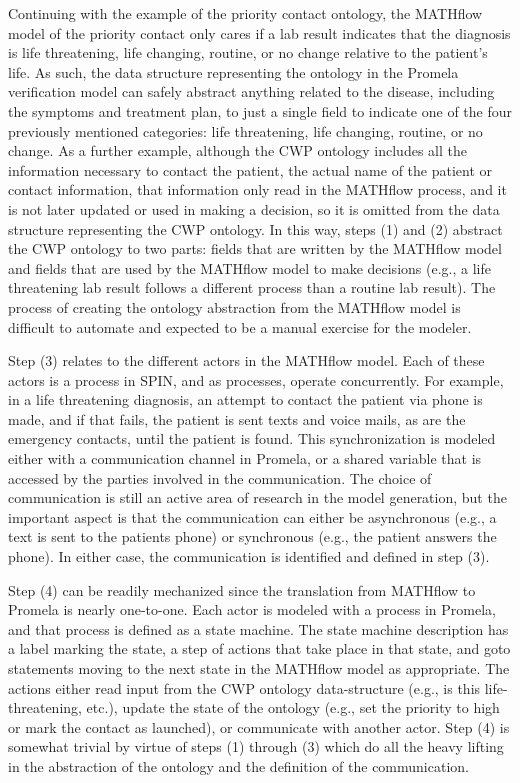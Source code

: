 \begin{itemize}
Continuing with the example of the priority contact ontology, the MATHflow model of the priority contact only cares if a lab result indicates that the diagnosis is life threatening, life changing, routine, or no change relative to the patient's life. As such, the data structure representing the ontology in the Promela verification model can safely abstract anything related to the disease, including the symptoms and treatment plan, to just a single field to indicate one of the four previously mentioned categories: life threatening, life changing, routine, or no change.  As a further example, although the CWP ontology includes all the information necessary to contact the patient, the actual name of the patient or contact information, that information only read in the MATHflow process, and it is not later updated or used in making a decision, so it is omitted from the data structure representing the CWP ontology. In this way, steps (1) and (2) abstract the CWP ontology to two parts: fields that are written by the MATHflow model and fields that are used by the MATHflow model to make decisions (e.g., a life threatening lab result follows a different process than a routine lab result). The process of creating the ontology abstraction from the MATHflow model is difficult to automate and expected to be a manual exercise for the modeler.

Step (3) relates to the different actors in the MATHflow model. Each of these actors is a process in SPIN, and as processes, operate concurrently. For example, in a life threatening diagnosis, an attempt to contact the patient via phone is made, and if that fails, the patient is sent texts and voice mails, as are the emergency contacts, until the patient is found. This synchronization is modeled either with a communication channel in Promela, or a shared variable that is accessed by the parties involved in the communication. The choice of communication is still an active area of research in the model generation, but the important aspect is that the communication can either be asynchronous (e.g., a text is sent to the patients phone) or synchronous (e.g., the patient answers the phone). In either case, the communication is identified and defined in step (3).

Step (4) can be readily mechanized since the translation from MATHflow to Promela is nearly one-to-one. Each actor is modeled with a process in Promela, and that process is defined as a state machine. The state machine description has a label marking the state, a step of actions that take place in that state, and goto statements moving to the next state in the MATHflow model as appropriate. The actions either read input from the CWP ontology data-structure (e.g., is this life-threatening, etc.), update the state of the ontology (e.g., set the priority to high or mark the contact as launched), or communicate with another actor. Step (4) is somewhat trivial by virtue of steps (1) through (3) which do all the heavy lifting in the abstraction of the ontology and the definition of the communication.


\end{itemize}
